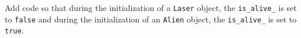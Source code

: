 Add code so that during the initialization of a \verb!Laser! object, the
\verb!is_alive_! is set to \verb!false! and during the initialization
of an \verb!Alien! object, the \verb!is_alive_! is set to \verb!true!.

